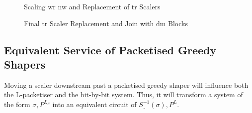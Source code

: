 \begin{figure}[H]
  \centering
  \def\svgwidth{0.95\textheight}
   \vspace*{-10mm}
 \hspace*{-10mm}
  \caption{Scaling \gls{wr} \gls{nw} and Replacement of \gls{tr} Scalers}
  \label{fig:block4}
\end{figure}

\begin{figure}[H]
  \centering
  \def\svgwidth{0.95\textheight}
  \vspace*{-10mm}
 \hspace*{-10mm}
  \caption{Final \gls{tr} Scaler Replacement and Join with \gls{dm} Blocks}
  \label{fig:block5}
\end{figure}

\subsection{Equivalent Service of Packetised Greedy Shapers}
Moving a scaler downstream past a packetised greedy shaper will influence both the L-packetiser and the bit-by-bit system.
Thus, it will transform a system of the form $\sigma, P^{L_{S}}$ into an equivalent circuit of  $\underline{S^{-1}}(\sigma), P^{L}$.

